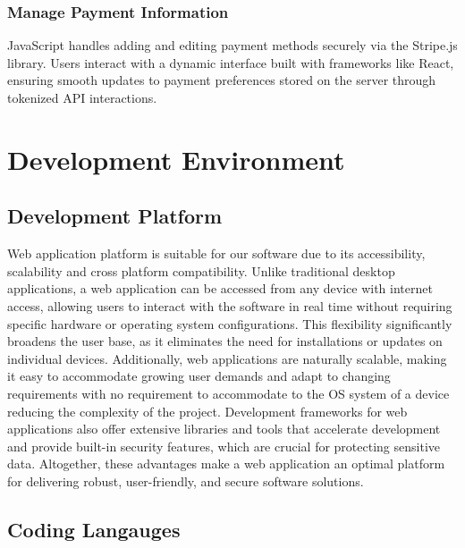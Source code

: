 \documentclass[conference]{IEEEtran}
\begin{document}
\subsubsection{Manage Payment Information}
JavaScript handles adding and editing payment methods securely via the Stripe.js library. Users interact with a dynamic interface built with frameworks like React, ensuring smooth updates to payment preferences stored on the server through tokenized API interactions.



\section{Development Environment}
\subsection{Development Platform}
Web application platform is suitable for our software due to its accessibility, scalability and cross platform compatibility. Unlike traditional desktop applications, a web application can be accessed from any device with internet access, allowing users to interact with the software in real time without requiring specific hardware or operating system configurations. This flexibility significantly broadens the user base, as it eliminates the need for installations or updates on individual devices. Additionally, web applications are naturally scalable, making it easy to accommodate growing user demands and adapt to changing requirements with no requirement to accommodate to the OS system of a device reducing the complexity of the project. Development frameworks for web applications also offer extensive libraries and tools that accelerate development and provide built-in security features, which are crucial for protecting sensitive data. Altogether, these advantages make a web application an optimal platform for delivering robust, user-friendly, and secure software solutions.  

\subsection{Coding Langauges}
\end{document}

